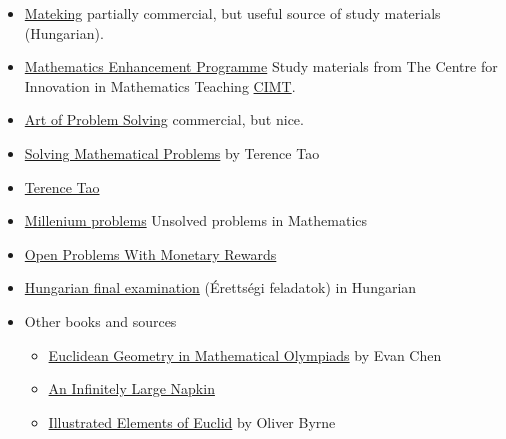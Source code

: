 \documentclass{article}
\begin{document}
\begin{itemize}
    
    
    \item \href{https://www.mateking.hu/}{Mateking} partially commercial, but useful source of study materials (Hungarian).
    
    \item \href{http://www.cimt.org.uk/projects/mep/index.htm}{Mathematics Enhancement Programme} Study materials from The Centre for Innovation in Mathematics Teaching \href{http://www.cimt.org.uk/}{CIMT}.
    
    \item \href{https://artofproblemsolving.com/online}{Art of Problem Solving} commercial, but nice.
    
    \item \href{https://www.goodreads.com/book/show/265415.Solving_Mathematical_Problems}{Solving Mathematical Problems} by Terence Tao
    
    \item \href{https://terrytao.wordpress.com/}{Terence Tao} 
    
    \item \href{http://www.claymath.org/millennium-problems}{Millenium problems} Unsolved problems in Mathematics
    
    \item \href{https://mathoverflow.net/questions/66084/open-problems-with-monetary-rewards}{Open Problems With Monetary Rewards}
    
    \item \href{https://matek.fazekas.hu/index.php?option=com_content&view=article&id=156&Itemid=217}{Hungarian final examination} (Érettségi feladatok) in Hungarian
    
    \item Other books and sources
    \begin{itemize}
        \item \href{https://web.evanchen.cc/geombook.html}{Euclidean Geometry in Mathematical Olympiads} by Evan Chen
        \item \href{https://web.evanchen.cc/napkin.html}{An Infinitely Large Napkin}
        \item \href{https://publicdomainreview.org/collection/the-first-six-books-of-the-elements-of-euclid-1847}{Illustrated Elements of Euclid} by Oliver Byrne 
    \end{itemize}
    

\end{itemize}
\end{document}
